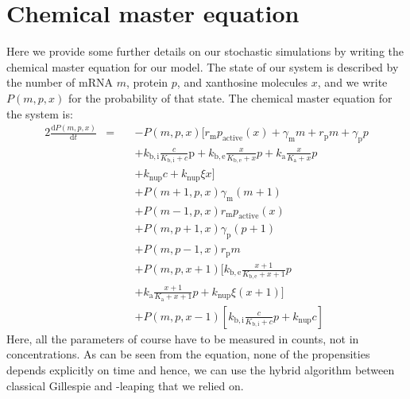 \documentclass[10pt,letterpaper]{article}
\newcommand{\n}[1]{\mathrm{#1}}
\newcommand{\dd}[2]{\frac{\mathrm{d} #1}{\mathrm{d} #2}}
\begin{document}
\section{Chemical master equation}
Here we provide some further details on our stochastic simulations by
writing the chemical master equation for our model. The state of our system
is described by the number of mRNA $m$, protein $p$, and xanthosine
molecules $x$, and we write $P(m,p,x)$ for the probability of that state.
The chemical master equation for the system is:
\begin{alignat}{2}
\dd{P(m,p,x)}{t} &= \ && - P(m,p,x) [ r_{\n{m}} p_{\n{active}}(x) + \gamma_{\n{m}} m + r_{\n{p}} m + \gamma_{\n{p}} p \nonumber \\ & && + k_{\n{b,i}} \frac{c}{K_{\n{b,i}} + c} \n{p} + k_{\n{b,e}} \frac{x}{K_{\n{b,e}} + x} p + k_{\n{a}} \frac{x}{K_{\n{a}} + x} p \nonumber \\ & && + k_{\n{nup}} c + k_{\n{nup}} \xi x ] \nonumber \\ & && 
+ P(m+1,p,x) \gamma_{\n{m}} (m + 1) \nonumber \\ & &&  + P(m-1,p,x) r_{\n{m}} p_{\n{active}}(x) \nonumber \\ & && 
+ P(m,p+1,x) \gamma_{\n{p}} (p + 1) \nonumber \\ & &&  + P(m,p-1,x) r_{\n{p}} m \nonumber \\ & && 
+ P(m,p,x+1) [ k_{\n{b,e}} \frac{x+1}{K_{\n{b,e}} + x+1} p \nonumber \\ & && + k_{\n{a}} \frac{x+1}{K_{\n{a}} + x+1} p + k_{\n{nup}} \xi (x+1) ] \nonumber \\ & &&
+ P(m,p,x-1) [ k_{\n{b,i}} \frac{c}{K_{\n{b,i}} + c} p + k_{\n{nup}} c ]  
\end{alignat}
Here, all the parameters of course have to be measured in counts, not in
concentrations. As can be seen from the equation, none of the propensities
depends explicitly on time and hence, we can use the hybrid algorithm
between classical Gillespie and \texttau-leaping that we relied on.

\FloatBarrier
\end{document}
